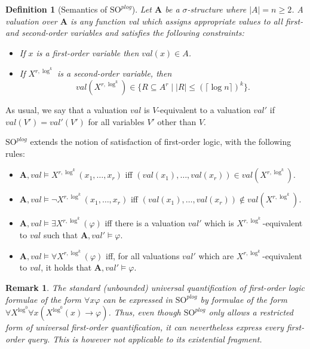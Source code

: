 \documentclass{article}
\newtheorem{definition}{Definition}
\newtheorem{remark}{Remark}
\begin{document}
\begin{definition}[Semantics of $\mathrm{SO}^{\mathit{plog}}$]
Let $\mathbf{A}$ be a $\sigma$-structure where $|A| = n \geq 2$. A valuation over $\mathbf{A}$ is any function \textit{val} which assigns appropriate values to all first- and second-order variables and satisfies the following constraints: 
\begin{itemize}

\item If $x$ is a first-order variable then $\mathit{val}(x) \in A$. 

\item If $X^{r,\log^k}$ is a second-order variable, then 
\[\mathit{val}(X^{r,\log^k}) \in \{R\subseteq A^r \mid |R| \leq (\lceil \log n \rceil)^k\}.\]
\end{itemize}
\end{definition}
As usual, we say that a valuation $\mathit{val}$ is $V$-equivalent to a valuation $\mathit{val}'$ if $\mathit{val}(V') = \mathit{val}'(V')$ for all variables $V'$ other than $V$.

$\mathrm{SO}^{\mathit{plog}}$ extends the notion of satisfaction of first-order logic, with the following rules:
\begin{itemize}
     \item $\mathbf{A},\mathit{val} \models X^{r,\log^k}(x_1,\dots,x_r) $ iff $(\mathit{val}(x_1),\dots,\mathit{val}(x_r))\in \mathit{val}( X^{r,\log^k})$.
     \item $\mathbf{A},\mathit{val} \models \neg X^{r,\log^k}(x_1,\dots,x_r) $ iff $(\mathit{val}(x_1),\dots,\mathit{val}(x_r))\not\in \mathit{val}( X^{r,\log^k})$.
     
     \item $\mathbf{A},\mathit{val} \models \exists X^{r,\log^k} (\varphi)$  iff there is a valuation $\mathit{val}'$ which is $X^{r,\log^k}$-equivalent to $\mathit{val}$ such that $\mathbf{A}, \mathit{val}' \models \varphi$.
     
     \item $\mathbf{A},\mathit{val} \models \forall X^{r,\log^k} (\varphi)$  iff, for all valuations $\mathit{val}'$ which are $X^{r,\log^k}$-equivalent to $\mathit{val}$, it holds that $\mathbf{A}, \mathit{val}' \models \varphi$.
     
\end{itemize}

\begin{remark}\label{r1}
The standard (unbounded) universal quantification of first-order logic formulae of the form 
$\forall x \varphi$ can be expressed in $\mathrm{SO}^{\mathit{plog}}$ by formulae of the form $\forall X^{\log^0} \forall x (X^{\log^0}(x) \rightarrow \varphi)$. Thus, even though $\mathrm{SO}^{\mathit{plog}}$ only allows a restricted form of universal first-order quantification, it can nevertheless express every first-order query. This is however not applicable to its existential fragment.   
\end{remark} 
\end{document}
